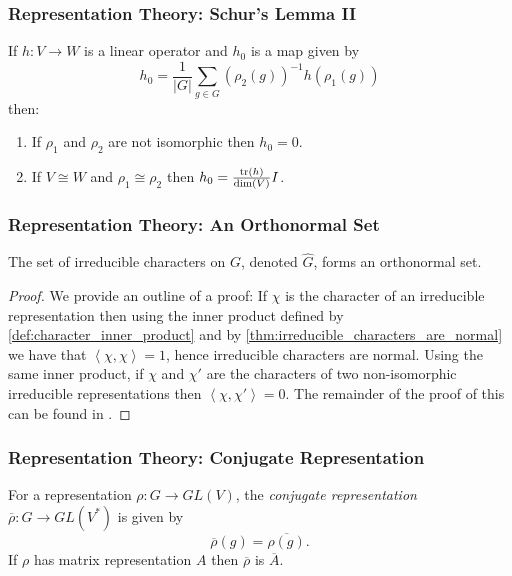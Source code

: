 \documentclass{beamer}
\newcommand{\abs}[1]{\left\lvert #1 \right\rvert}
\newcommand{\inner}[2]{\left\langle #1, #2 \right\rangle}
\newcommand{\tr}[1]{\textnormal{tr}\left(#1\right)}
\renewcommand{\dim}[1]{\textnormal{dim}\left(#1\right)}
\newcommand{\conj}[1]{\overline{#1}}
\newcommand{\iso}{\cong}
\begin{document}
\begin{frame}
\frametitle{Representation Theory: Schur's Lemma II}
\begin{theorem}
            If $h: V \to W$ is a linear operator and $h_0$ is a map given by
                $$h_0 = \frac{1}{\abs{G}} \sum_{g \in G} \left(\rho_2(g)\right)^{-1} h(\rho_1(g))$$
            then:
                \begin{enumerate}
                \item If $\rho_1$ and $\rho_2$ are not isomorphic then $h_0 = 0$.
                \item If $V \iso W$ and $\rho_1 \iso \rho_2$ then $h_0 = \frac{\tr{h}}{\dim{V}} I$.
                \end{enumerate}
        \end{theorem}
\end{frame}

\begin{frame}
\frametitle{Representation Theory: An Orthonormal Set}
        \begin{theorem}\label{thm:serre15}
            The set of irreducible characters on $G$, denoted $\hat{G}$, forms an orthonormal set.
        \end{theorem}
        \begin{proof}
            We provide an outline of a proof:
            If $\chi$ is the character of an irreducible representation then using the inner product defined by \ref{def:character_inner_product} and by \ref{thm:irreducible_characters_are_normal} we have that $\inner{\chi}{\chi} = 1$, hence irreducible characters are normal.
            Using the same inner product, if $\chi$ and $\chi'$ are the characters of two non-isomorphic irreducible representations then $\inner
{\chi}{\chi'} = 0$.
            The remainder of the proof of this can be found in \cite{serre}.
        \end{proof}
\end{frame}

\begin{frame}
\frametitle{Representation Theory: Conjugate Representation}
        \begin{definition}\label{def:conjugate_representation}
            For a representation $\rho: G \to GL(V)$, the \textit{conjugate representation} $\conj{\rho}: G \to GL(V^*)$ is given by
                $$\conj{\rho}(g) = \conj{\rho(g)}.$$
            If $\rho$ has matrix representation $A$ then $\conj{\rho}$ is $\overline{A}$.
        \end{definition}
\end{frame}
\end{document}
